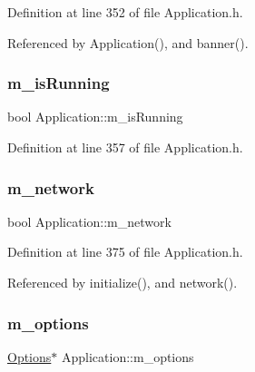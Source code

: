 Definition at line 352 of file Application.\+h.



Referenced by Application(), and banner().

\mbox{\label{classApplication_ae316ea43e74cc0d536dcbb16b2fbb974}} 
\subsubsection{\texorpdfstring{m\+\_\+is\+Running}{m\_isRunning}}
{\footnotesize\ttfamily bool Application\+::m\+\_\+is\+Running\hspace{0.3cm}{\ttfamily [protected]}}



Definition at line 357 of file Application.\+h.

\mbox{\label{classApplication_a7dc2bb72356cd9186eaad49eb506995a}} 
\subsubsection{\texorpdfstring{m\+\_\+network}{m\_network}}
{\footnotesize\ttfamily bool Application\+::m\+\_\+network\hspace{0.3cm}{\ttfamily [private]}}



Definition at line 375 of file Application.\+h.



Referenced by initialize(), and network().

\mbox{\label{classApplication_a3b0c74bf1ba99a5042990e3fefaa8963}} 
\subsubsection{\texorpdfstring{m\+\_\+options}{m\_options}}
{\footnotesize\ttfamily \hyperlink{classOptions}{Options}$\ast$ Application\+::m\+\_\+options\hspace{0.3cm}{\ttfamily [private]}}



